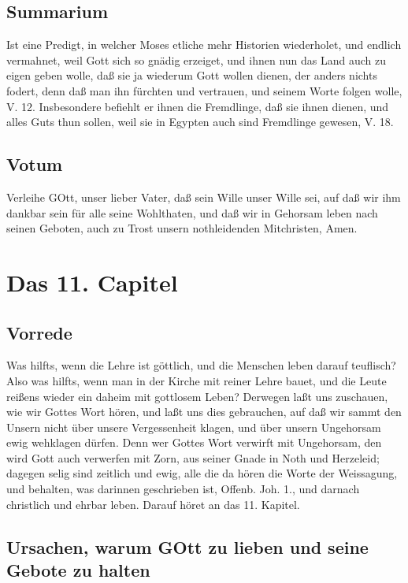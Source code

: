 \section{Summarium}

Ist eine Predigt, in welcher Moses etliche mehr Historien wiederholet, und endlich vermahnet, weil Gott sich so gnädig erzeiget, und ihnen nun das Land auch zu eigen geben wolle, daß sie ja wiederum Gott wollen dienen, der anders nichts fodert, denn daß man ihn fürchten und vertrauen, und seinem Worte folgen wolle, V. 12. Insbesondere befiehlt er ihnen die Fremdlinge, daß sie ihnen dienen, und alles Guts thun sollen, weil sie in Egypten auch sind Fremdlinge gewesen, V. 18.

\section{Votum}

Verleihe GOtt, unser lieber Vater, daß sein Wille unser Wille sei, auf daß wir ihm dankbar sein für alle seine Wohlthaten, und daß wir in Gehorsam leben nach seinen Geboten, auch zu Trost unsern nothleidenden Mitchristen, Amen.

\chapter{Das 11. Capitel}

\section{Vorrede}

Was hilfts, wenn die Lehre ist göttlich, und die Menschen leben darauf teuflisch? Also was hilfts, wenn man in der Kirche mit reiner Lehre bauet, und die Leute reißens wieder ein daheim mit gottlosem Leben? Derwegen laßt uns zuschauen, wie wir Gottes Wort hören, und laßt uns dies gebrauchen, auf daß wir sammt den Unsern nicht über unsere Vergessenheit klagen, und über unsern Ungehorsam ewig wehklagen dürfen. Denn wer Gottes Wort verwirft mit Ungehorsam, den wird Gott auch verwerfen mit Zorn, aus seiner Gnade in Noth und Herzeleid; dagegen selig sind zeitlich und ewig, alle die da hören die Worte der Weissagung, und behalten, was darinnen geschrieben ist, Offenb. Joh. 1., und darnach christlich und ehrbar leben. Darauf höret an das 11. Kapitel.

\section[Ursachen, warum GOtt zu lieben und seine Gebote]{Ursachen, warum GOtt zu lieben und seine Gebote zu halten}

